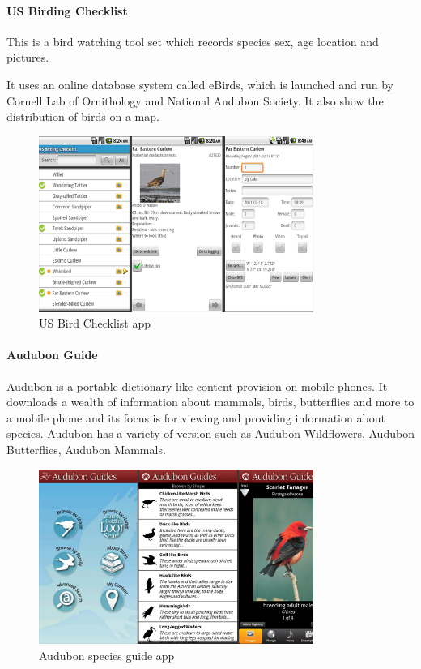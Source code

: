 \paragraph{US Birding Checklist}
This is a bird watching tool set which records species sex, age location and pictures\cite{similarproduct:usbird}.

It uses an online database system called eBirds\cite{similarproduct:ebird}, which is launched and run by Cornell Lab of Ornithology and National Audubon Society. It also show the distribution of birds on a map.

\begin{figure}[htb]
    \centering
    \includegraphics[width=0.8\textwidth]{introduction/project_description/usbirdingchecklist.png}
    \caption{US Bird Checklist app}
    \label{fig:usbirdapp}
\end{figure}

\paragraph{Audubon Guide}
Audubon is a portable dictionary like content provision on mobile phones. It downloads a wealth of information about mammals, birds, butterflies and more to a mobile phone and its focus is for viewing and providing information about species\cite{similarproduct:audubon}. Audubon has a variety of version such as Audubon Wildflowers, Audubon Butterflies, Audubon Mammals.

\begin{figure}[htb]
    \centering
    \includegraphics[width=0.8\textwidth]{introduction/project_description/audubonguide.png}
    \caption{Audubon species guide app}
    \label{fig:audubonapp}
\end{figure}
